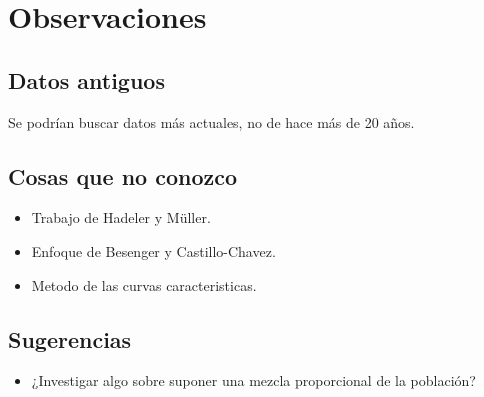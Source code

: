 \documentclass[
]{book}
\providecommand{\tightlist}{%
  \setlength{\itemsep}{0pt}\setlength{\parskip}{0pt}}
\begin{document}
\hypertarget{observaciones}{%
\section*{Observaciones}\label{observaciones}}

\hypertarget{old}{%
\subsection{Datos antiguos}\label{old}}

Se podrían buscar datos más actuales, no de hace más de 20 años.

\hypertarget{desconocido}{%
\subsection{Cosas que no conozco}\label{desconocido}}

\begin{itemize}
\tightlist
\item
  Trabajo de Hadeler y Müller.
\item
  Enfoque de Besenger y Castillo-Chavez.
\item
  Metodo de las curvas caracteristicas.
\end{itemize}

\hypertarget{sug}{%
\subsection{Sugerencias}\label{sug}}

\begin{itemize}
\tightlist
\item
  ¿Investigar algo sobre suponer una mezcla proporcional de la población?
\end{itemize}

  
\end{document}
